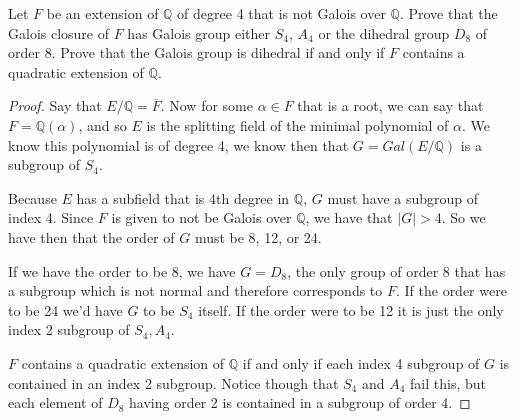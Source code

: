 \documentclass[11pt]{article}
\newenvironment{problem}[2][Problem\!]{\begin{tcolorbox}\begin{trivlist}
\item[\hskip \labelsep {\bfseries #1}\hskip \labelsep {\bfseries #2}]}{\end{trivlist}\end{tcolorbox}}
\newcommand{\qq}{\mathbb Q}   %
\newcommand{\abs}[1]{\left\lvert#1\right\rvert} %
\begin{document}
\vspace*{15pt}

\begin{problem}{14.6.11}
    Let $F$ be an extension of $\qq$ of degree 4 that is not Galois over $\qq$. Prove that the Galois closure of $F$ has Galois group either $S_4$, $A_4$ or the dihedral group $D_8$ of order 8. Prove that the Galois group is dihedral if and only if $F$ contains a quadratic extension of $\qq$.
\end{problem}
\begin{proof}
    Say that $E/\qq = \overline{F}$. Now for some $\alpha\in F$ that is a root, we can say that $F = \qq(\alpha)$, and so $E$ is the splitting field of the minimal polynomial of $\alpha$. We know this polynomial is of degree 4, we know then that $G = Gal(E/\qq)$ is a subgroup of $S_4$. 

    Because $E$ has a subfield that is 4th degree in $\qq$, $G$ must have a subgroup of index 4. Since $F$ is given to not be Galois over $\qq$, we have that $\abs{G} > 4$. So we have then that the order of $G$ must be 8, 12, or 24.

    If we have the order to be $8$, we have $G = D_8$, the only group of order 8 that has a subgroup which is not normal and therefore corresponds to $F$. If the order were to be 24 we'd have $G$ to be $S_4$ itself. If the order were to be 12 it is just the only index 2 subgroup of $S_4, A_4$. 

    $F$ contains a quadratic extension of $\qq$ if and only if each index 4 subgroup of $G$ is contained in an index 2 subgroup. Notice though that $S_4$ and $A_4$ fail this, but each element of $D_8$ having order 2 is contained in a subgroup of order 4. 
\end{proof}

\vspace*{15pt}
\end{document}
